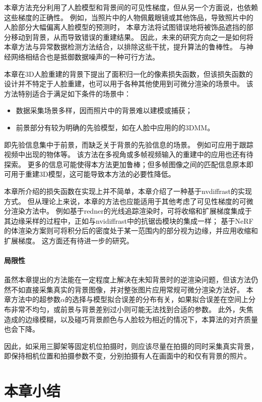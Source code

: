 本章方法充分利用了人脸模型和背景间的可见性梯度，但从另一个方面说，也依赖这些梯度的正确性。
例如，当照片中的人物佩戴眼镜或其他饰品，导致照片中的人脸部分大幅偏离人脸模型的预测时，
本章方法将试图错误地将被饰品遮挡的部分移动到背景，从而导致错误的重建结果。
因此，未来的研究方向之一是如何将本章方法与异常数据检测方法结合，以排除这些干扰，提升算法的鲁棒性。
与神经网络相结合也是抵御数据噪声的一种可行方法。

本章在3D人脸重建的背景下提出了面积归一化的像素损失函数，但该损失函数的设计并不特定于人脸重建，也可以用于各种其他使用到可微分渲染的场景中。
该方法特别适合于满足如下条件的场景中：
\begin{itemize}
    \item 数据采集场景多样，因而照片中的背景难以建模或捕获；
    \item 前景部分有较为明确的先验模型，如在人脸中应用的的3DMM。
\end{itemize}
即先验信息集中于前景，而缺乏关于背景的先验信息的场景。
例如可应用于跟踪视频中出现的物体等。
该方法在多视角或多帧视频输入的重建中的应用也还有待探索。
更多的信息可能使得本方法更加鲁棒；但多帧图像之间的匹配信息原本即可用于重建3D模型，这可能导致本方法的必要性降低。

本章所介绍的损失函数在实现上并不简单，本章介绍了一种基于nvdiffrast的实现方式。
但从理论上来说，本章的方法也应能适用于其他考虑了可见性梯度的可微分渲染方法中。
例如基于redner\citep{redner}的光线追踪渲染时，可将收缩和扩展梯度集成于其边缘采样的过程中，正如与nvidiffrast中的抗锯齿模块的集成一样；
基于NeRF\citep{nerf}的体渲染方案则可将积分后的密度处于某一范围内的部分视为边缘，并应用收缩和扩展梯度。
这方面还有待进一步的研究。

\paragraph{局限性}

虽然本章提出的方法能在一定程度上解决在未知背景时的逆渲染问题，但该方法仍然不如直接采集真实的背景图像，并对整张图片应用常规可微分渲染方法好。
本章方法中的超参数$\alpha$的选择与模型拟合误差的分布有关，如果拟合误差在空间上分布非常不均匀，或前景与背景差别过小则可能无法找到合适的参数。
此外，失焦造成的边缘模糊，以及碰巧背景颜色与人脸较为相近的情况下，本算法的对齐质量也会下降。

因此，如采用三脚架等固定机位拍摄时，则应该尽量在拍摄的同时采集真实背景，即保持相机位置和拍摄参数不变，分别拍摄有人在画面中的和仅有背景的照片。

\section*{本章小结}

